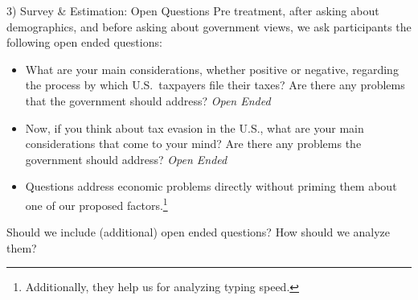 \documentclass{beamer}
\begin{document}
\begin{frame}{3) Survey \& Estimation: Open Questions } 
\label{equations5}
Pre treatment, after asking about demographics, and before asking about government views, we ask participants the following open ended questions: 
\begin{itemize}
    \item What are your main considerations, whether positive or negative, regarding the process by which U.S.\ taxpayers file their taxes? Are there any problems that the government should address? \textit{Open Ended}
    \item Now, if you think about tax evasion in the U.S., what are your main considerations that come to your mind? Are there any problems the government should address? \textit{Open Ended}\vspace{0.5em}
    \item[$\Rightarrow$] Questions address economic problems directly without priming them about one of our proposed factors.\footnote[10]{Additionally, they help us for analyzing typing speed.} \vspace{1em}
\end{itemize}
\alert{Should we include (additional) open ended questions? How should we analyze them?}

\end{frame}

\end{document}
